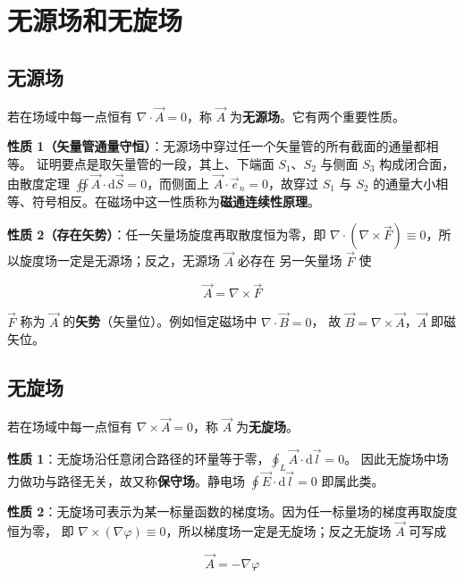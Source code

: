 
\section{无源场和无旋场}

\subsection{无源场}

若在场域中每一点恒有 $\nabla\cdot\vec{A}=0$，称 $\vec{A}$ 为\textbf{无源场}。它有两个重要性质。

\textbf{性质 1（矢量管通量守恒）}：无源场中穿过任一个矢量管的所有截面的通量都相等。
证明要点是取矢量管的一段，其上、下端面 $S_1$、$S_2$ 与侧面 $S_3$ 构成闭合面，由散度定理
$\oiint\vec{A}\cdot\mathrm{d}\vec{S}=0$，而侧面上 $\vec{A}\cdot\vec{e}_n=0$，故穿过 $S_1$ 与
$S_2$ 的通量大小相等、符号相反。在磁场中这一性质称为\textbf{磁通连续性原理}。

\textbf{性质 2（存在矢势）}：任一矢量场旋度再取散度恒为零，即
$\nabla\cdot(\nabla\times\vec{F})\equiv 0$，所以旋度场一定是无源场；反之，无源场 $\vec{A}$ 必存在
另一矢量场 $\vec{F}$ 使
\begin{formulaBox}
\[
\vec{A}=\nabla\times\vec{F}
\]
\end{formulaBox}

$\vec{F}$ 称为 $\vec{A}$ 的\textbf{矢势}（矢量位）。例如恒定磁场中 $\nabla\cdot\vec{B}=0$，
故 $\vec{B}=\nabla\times\vec{A}$，$\vec{A}$ 即磁矢位。

\subsection{无旋场}

若在场域中每一点恒有 $\nabla\times\vec{A}=0$，称 $\vec{A}$ 为\textbf{无旋场}。

\textbf{性质 1}：无旋场沿任意闭合路径的环量等于零，$\oint_L\vec{A}\cdot\mathrm{d}\vec{l}=0$。
因此无旋场中场力做功与路径无关，故又称\textbf{保守场}。静电场 $\oint\vec{E}\cdot\mathrm{d}\vec{l}=0$ 即属此类。

\textbf{性质 2}：无旋场可表示为某一标量函数的梯度场。因为任一标量场的梯度再取旋度恒为零，
即 $\nabla\times(\nabla\varphi)\equiv 0$，所以梯度场一定是无旋场；反之无旋场 $\vec{A}$ 可写成
\begin{formulaBox}
\[
\vec{A}=-\nabla\varphi
\]
\end{formulaBox}

